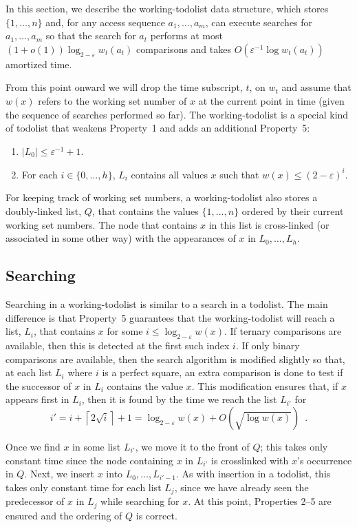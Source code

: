 \documentclass[12pt]{patmorin}
\newcommand{\eps}{\varepsilon}
\begin{document}
In this section, we describe the working-todolist data structure, which
stores $\{1,\ldots,n\}$ and, for any access sequence $a_1,\ldots,a_m$,
can execute searches for $a_1,\ldots,a_m$ so that the search for $a_t$
performs at most $(1+o(1))\log_{2-\eps} w_t(a_t)$ comparisons and takes
$O(\eps^{-1}\log w_t(a_t))$ amortized time.

From this point onward we will drop the time subscript, $t$, on $w_t$
and assume that $w(x)$ refers to the working set number of $x$ at the
current point in time (given the sequence of searches performed so far).
The working-todolist is a special kind of todolist that weakens Property~1
and adds an additional Property~5:

\begin{enumerate}
\item $|L_0|\le \eps^{-1}+1$.
\setcounter{enumi}{4}
\item For each $i\in\{0,\ldots,h\}$, $L_i$ contains all values $x$ such that $w(x)\le (2-\eps)^i$.
\end{enumerate}

For keeping track of working set numbers, a working-todolist also stores a
doubly-linked list, $Q$, that contains the values $\{1,\ldots,n\}$
ordered by their current working set numbers.  The node that contains $x$
in this list is cross-linked (or associated in some other way) with the
appearances of $x$ in $L_0,\ldots,L_h$.

\subsection{Searching}

Searching in a working-todolist is similar to a search in a todolist.
The main
difference is that Property~5 guarantees that the working-todolist will reach
a list, $L_i$, that contains $x$ for some $i\le\log_{2-\eps} w(x)$.
If ternary comparisons are available, then this is detected at the
first such index $i$.  If only binary comparisons are available, then
the search algorithm is modified slightly so that, at each list $L_i$
where $i$ is a perfect square, an extra comparison is done to test if
the successor of $x$ in $L_i$ contains the value $x$.  This modification
ensures that, if $x$ appears first in $L_i$, then it is found by the
time we reach the list $L_{i'}$ for
\[
     i'=i+\left\lceil 2\sqrt{i}\right\rceil + 1 = \log_{2-\eps} w(x) + O(\sqrt{\log w(x)}) \enspace .
\]

Once we find $x$ in some list $L_{i'}$, we move it to the front of $Q$;
this takes only constant time since the node containing $x$ in $L_{i'}$
is crosslinked with $x$'s occurrence in $Q$.  Next, we insert $x$ into
$L_0,\ldots,L_{i'-1}$.  As with insertion in a todolist, this takes only
constant time for each list $L_j$, since we have already seen the predecessor
of $x$ in $L_j$ while searching for $x$.  
At this point, Properties 2--5 are ensured and the ordering of $Q$ is
correct.  
\end{document}
